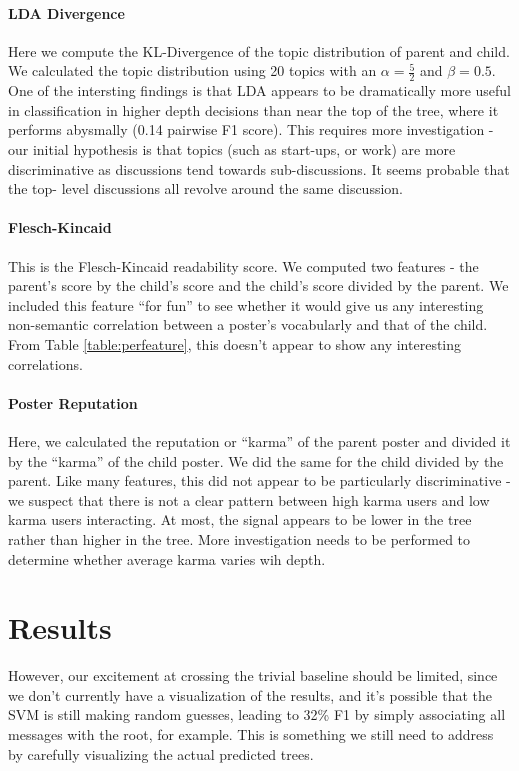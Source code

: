 \documentclass{article}
\begin{document}
\paragraph{LDA Divergence} Here we compute the KL-Divergence of the topic distribution
of parent and child. We calculated the topic distribution using 20 topics with
an $\alpha=\frac{5}{2}$ and $\beta = 0.5$. One of the intersting findings is
that LDA appears to be dramatically more useful in classification in higher
depth decisions than near the top of the tree, where it performs abysmally
(0.14 pairwise F1 score). This requires more investigation - our initial
hypothesis is that topics (such as start-ups, or work) are more discriminative
as discussions tend towards sub-discussions. It seems probable that the top-
level discussions all revolve around the same discussion.

\paragraph{Flesch-Kincaid} This is the Flesch-Kincaid readability score. We computed
two features - the parent's score by the child's score and the child's score
divided by the parent. We included this feature ``for fun'' to see whether it
would give us any interesting non-semantic correlation between a poster's
vocabularly and that of the child. From Table \ref{table:perfeature}, this
doesn't appear to show any interesting correlations.

\paragraph{Poster Reputation} Here, we calculated the reputation or ``karma'' of the
parent poster and divided it by the ``karma'' of the child poster. We did the
same for the child divided by the parent. Like many features, this did not
appear to be particularly discriminative - we suspect that there is not a
clear pattern between high karma users and low karma users interacting. At
most, the signal appears to be lower in the tree rather than higher in the
tree. More investigation needs to be performed to determine whether average
karma varies wih depth.


\section{Results}
\label{sec:results}
However, our excitement at crossing the trivial baseline should be limited,
since we don't currently have a visualization of the results, and it's
possible that the SVM is still making random guesses, leading to 32\% F1 by
simply associating all messages with the root, for example. This is something
we still need to address by carefully visualizing the actual predicted trees.
\end{document}
